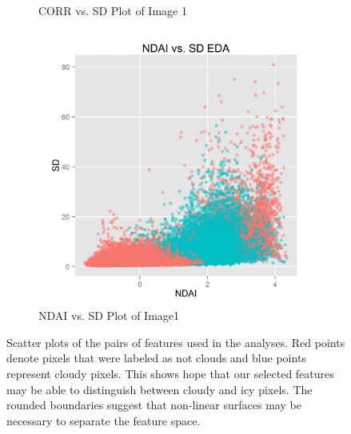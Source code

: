 \documentclass{article}\usepackage[]{graphicx}\usepackage[]{color}
\begin{document}
\begin{figure}[h]
\begin{subfigure}[b]{0.3\textwidth}
    \caption{CORR vs. SD Plot of Image 1}
    \label{CorrSd}
  \end{subfigure}  
  \begin{subfigure}[b]{0.3\textwidth}
    \includegraphics[width=\linewidth]{NDAI_vs_SD.png}
    \caption{NDAI vs. SD Plot of Image1}
    \label{NdaiSd}
  \end{subfigure}
  \caption{Scatter plots of the pairs of features used in the analyses. Red points denote pixels that were labeled as not clouds and blue points represent cloudy pixels. This shows hope that our selected features may be able to distinguish between cloudy and icy pixels.  The rounded boundaries suggest that non-linear surfaces may be necessary to separate the feature space.}
  \label{fig:Scatter}
\end{figure}
\end{document}
